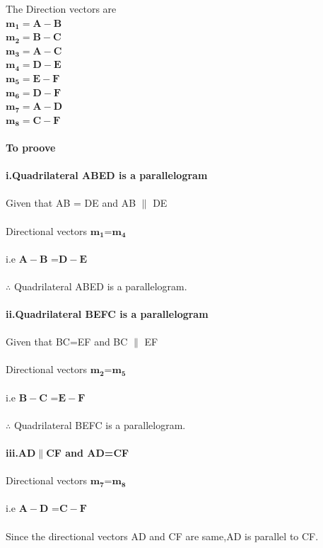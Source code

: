 \documentclass[10pt, a4paper]{article}
\begin{document}
The Direction vectors are\\
$\boldsymbol {m_1 = A - B }$\\
$\boldsymbol {m_2 = B - C} $\\
$\boldsymbol {m_3 = A - C} $\\
$\boldsymbol {m_4 = D - E} $\\
$\boldsymbol {m_5 = E - F} $\\
$\boldsymbol {m_6 = D - F} $\\
$\boldsymbol {m_7 = A - D} $\\
$\boldsymbol {m_8 = C - F} $\\\\
\textbf{To proove\\\\ i.Quadrilateral ABED is a parallelogram}\\\\
	Given that 
	AB = DE and AB $\parallel$ DE \\\\
	Directional vectors $\boldsymbol{m_1}$=$\boldsymbol{m_4}$\\\\
i.e $\boldsymbol{{A}-{B}}$ =$\boldsymbol{{D}-{E}}$\\\\
	$\therefore$ Quadrilateral ABED is a parallelogram.\\\\
\textbf{ii.Quadrilateral BEFC is a parallelogram}\\\\
	Given that BC=EF and BC $\parallel$ EF \\\\
	Directional vectors $\boldsymbol{m_2}$=$\boldsymbol{m_5}$\\\\
i.e $\boldsymbol{{B}-{C}}$ =$\boldsymbol{{E}-{F}}$\\\\
	$\therefore$ Quadrilateral BEFC is a parallelogram.\\\\
\textbf{iii.AD$\parallel$CF and AD=CF}\\\\
Directional vectors $\boldsymbol{m_7}$=$\boldsymbol{m_8}$\\\\
i.e $\boldsymbol{{A}-{D}}$ =$\boldsymbol{{C}-{F}} $\\\\	Since the directional vectors AD and CF are same,AD is parallel to CF.\\\\
\end{document}
